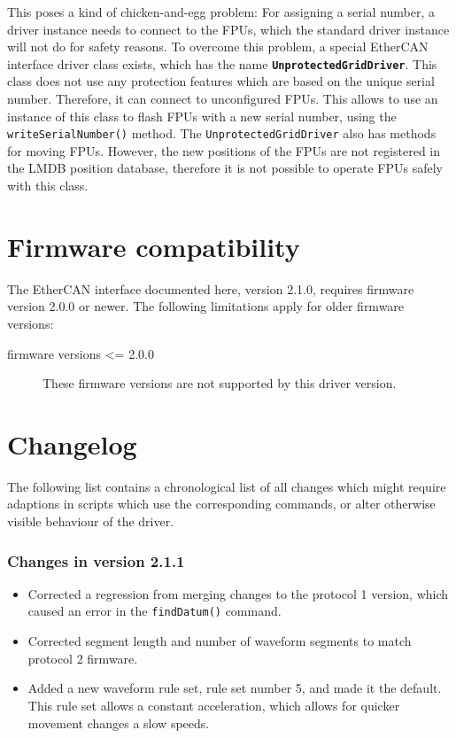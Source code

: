 \documentclass[fontsize=12,a4paper]{scrreprt}
\begin{document}
This poses a kind of chicken-and-egg problem: For assigning a serial
number, a driver instance needs to connect to the FPUs, which the
standard driver instance will not do for safety reasons. To overcome
this problem, a special EtherCAN interface driver class exists, which
has the name \textbf{\texttt{UnprotectedGridDriver}}. This class does
not use any protection features which are based on the unique serial
number. Therefore, it can connect to unconfigured FPUs. This allows to
use an instance of this class to flash FPUs with a new serial number,
using the \texttt{writeSerialNumber()} method. The
\texttt{UnprotectedGridDriver} also has methods for moving
FPUs. However, the new positions of the FPUs are not registered in the
LMDB position database, therefore it is not possible to operate FPUs
safely with this class.


\chapter{Firmware compatibility}
\label{sec:firmware_compatibility}

The EtherCAN interface documented here, version 2.1.0, requires
firmware version 2.0.0 or newer. The following limitations apply for
older firmware versions:

\begin{description}

\item[firmware versions <= 2.0.0] These firmware versions are not
  supported by this driver version.


\end{description}


\chapter{Changelog}
\label{sec:changelog}


The following list contains a chronological list of all changes which
might require adaptions in scripts which use the corresponding
commands, or alter otherwise visible behaviour of the driver.

\subsection*{Changes in version 2.1.1}
\begin{itemize}
\item Corrected a regression from merging changes to the protocol 1
  version, which caused an error in the \texttt{findDatum()} command.
\item Corrected segment length and number of waveform segments
  to match protocol 2 firmware.
\item Added a new waveform rule set, rule set number 5, and made it
  the default. This rule set allows a constant acceleration, which
  allows for quicker movement changes a slow speeds.
\end{itemize}
\end{document}
